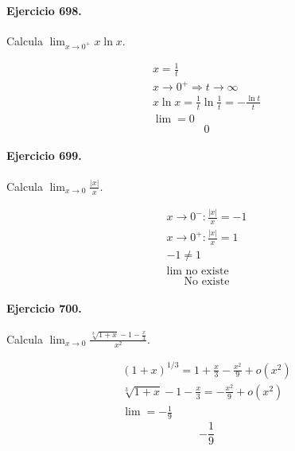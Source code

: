 \documentclass[11pt,a4paper]{article}
\begin{document}
\paragraph{Ejercicio 698.} Calcula $\displaystyle \lim_{x\to0^+}x\ln x$.

\[
\begin{aligned}
x=\frac1t\\
x\to0^+\Rightarrow t\to\infty\\
x\ln x=\frac1t\ln\frac1t=-\frac{\ln t}{t}\\
\lim=0
\end{aligned}
\]
\[\boxed{0}\]


\paragraph{Ejercicio 699.} Calcula $\displaystyle \lim_{x\to0}\frac{|x|}{x}$.

\[
\begin{aligned}
x\to0^-:\frac{|x|}{x}=-1\\
x\to0^+:\frac{|x|}{x}=1\\
-1\ne1\\
\lim\text{{ no existe}}
\end{aligned}
\]
\[\boxed{\text{{No existe}}}\]


\paragraph{Ejercicio 700.} Calcula $\displaystyle \lim_{x\to0}\frac{\sqrt[3]{1+x}-1-\frac{x}{3}}{x^2}$.

\[
\begin{aligned}
(1+x)^{1/3}=1+\frac{x}{3}-\frac{x^2}{9}+o(x^2)\\
\sqrt[3]{1+x}-1-\frac{x}{3}=-\frac{x^2}{9}+o(x^2)\\
\lim=-\frac19
\end{aligned}
\]
\[\boxed{-\frac19}\]


\newpage
\end{document}
